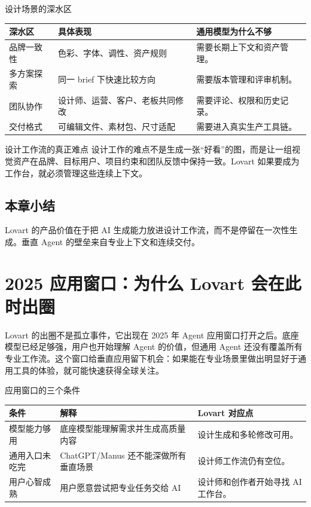 \documentclass[a4paper]{article}
\begin{document}
\begin{knowledgebox}{设计场景的深水区}
\begin{tabularx}{\textwidth}{p{}p{}X}
\toprule
深水区 & 具体表现 & 通用模型为什么不够 \\
\midrule
品牌一致性 & 色彩、字体、调性、资产规则 & 需要长期上下文和资产管理。 \\
多方案探索 & 同一 brief 下快速比较方向 & 需要版本管理和评审机制。 \\
团队协作 & 设计师、运营、客户、老板共同修改 & 需要评论、权限和历史记录。 \\
交付格式 & 可编辑文件、素材包、尺寸适配 & 需要进入真实生产工具链。 \\
\bottomrule
\end{tabularx}
\end{knowledgebox}

\begin{importantbox}{设计工作流的真正难点}
设计工作的难点不是生成一张“好看”的图，而是让一组视觉资产在品牌、目标用户、项目约束和团队反馈中保持一致。Lovart 如果要成为工作台，就必须管理这些连续上下文。
\end{importantbox}

\subsection{本章小结}

Lovart 的产品价值在于把 AI 生成能力放进设计工作流，而不是停留在一次性生成。垂直 Agent 的壁垒来自专业上下文和连续交付。

\section{2025 应用窗口：为什么 Lovart 会在此时出圈}

Lovart 的出圈不是孤立事件，它出现在 2025 年 Agent 应用窗口打开之后。底座模型已经足够强，用户也开始理解 Agent 的价值，但通用 Agent 还没有覆盖所有专业工作流。这个窗口给垂直应用留下机会：如果能在专业场景里做出明显好于通用工具的体验，就可能快速获得全球关注。

\begin{knowledgebox}{应用窗口的三个条件}
\begin{tabularx}{\textwidth}{p{}p{}X}
\toprule
条件 & 解释 & Lovart 对应点 \\
\midrule
模型能力够用 & 底座模型能理解需求并生成高质量内容 & 设计生成和多轮修改可用。 \\
通用入口未吃完 & ChatGPT/Manus 还不能深做所有垂直场景 & 设计师工作流仍有空位。 \\
用户心智成熟 & 用户愿意尝试把专业任务交给 AI & 设计师和创作者开始寻找 AI 工作台。 \\
\bottomrule
\end{tabularx}
\end{knowledgebox}
\end{document}
